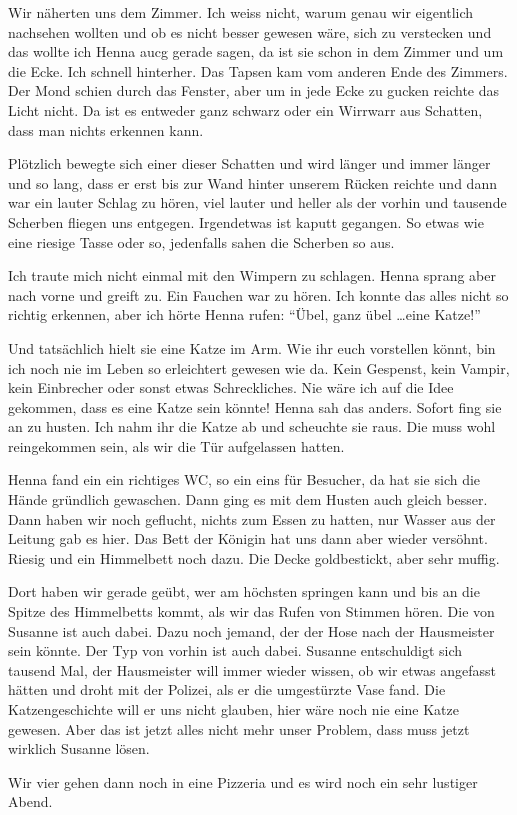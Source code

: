 Wir näherten uns dem Zimmer. Ich weiss nicht, warum genau wir eigentlich nachsehen wollten und ob es nicht besser gewesen wäre, sich zu verstecken und das wollte ich Henna aucg gerade sagen, da ist sie schon in dem Zimmer und um die Ecke. Ich schnell hinterher. Das Tapsen kam vom anderen Ende des Zimmers. Der Mond schien durch das Fenster, aber um in jede Ecke zu gucken reichte das Licht nicht. Da ist es entweder ganz schwarz oder ein Wirrwarr aus Schatten, dass man nichts erkennen kann.

Plötzlich bewegte sich einer dieser Schatten und wird länger und immer länger und so lang, dass er erst bis zur Wand hinter unserem Rücken reichte und dann war ein lauter Schlag zu hören, viel lauter und heller als der vorhin und tausende Scherben fliegen uns entgegen. Irgendetwas ist kaputt gegangen. So etwas wie eine riesige Tasse oder so, jedenfalls sahen die Scherben so aus.

Ich traute mich nicht einmal mit den Wimpern zu schlagen. Henna sprang aber nach vorne und greift zu. Ein Fauchen war zu hören. Ich konnte das alles nicht so richtig erkennen, aber ich hörte Henna rufen: \enquote{Übel, ganz übel \dots eine Katze!}

Und tatsächlich hielt sie eine Katze im Arm. Wie ihr euch vorstellen könnt, bin ich noch nie im Leben so erleichtert gewesen wie da. Kein Gespenst, kein Vampir, kein Einbrecher oder sonst etwas Schreckliches. Nie wäre ich auf die Idee gekommen, dass es eine Katze sein könnte! Henna sah das anders. Sofort fing sie an zu husten. Ich nahm ihr die Katze ab und scheuchte sie raus. Die muss wohl reingekommen sein, als wir die Tür aufgelassen hatten.

Henna fand ein ein richtiges WC, so ein eins für Besucher, da hat sie sich die Hände gründlich gewaschen. Dann ging es mit dem Husten auch gleich besser. Dann haben wir noch geflucht, nichts zum Essen zu hatten, nur Wasser aus der Leitung gab es hier. Das Bett der Königin hat uns dann aber wieder versöhnt. Riesig und ein Himmelbett noch dazu. Die Decke goldbestickt, aber sehr muffig. 

Dort haben wir gerade geübt, wer am höchsten springen kann und bis an die Spitze des Himmelbetts kommt, als wir das Rufen von Stimmen hören. Die von Susanne ist auch dabei. Dazu noch jemand, der der Hose nach der Hausmeister sein könnte. Der Typ von vorhin ist auch dabei. Susanne entschuldigt sich tausend Mal, der Hausmeister will immer wieder wissen, ob wir etwas angefasst hätten und droht mit der Polizei, als er die umgestürzte Vase fand. Die Katzengeschichte will er uns nicht glauben, hier wäre noch nie eine Katze gewesen. Aber das ist jetzt alles nicht mehr unser Problem, dass muss jetzt wirklich Susanne lösen.

Wir vier gehen dann noch in eine Pizzeria und es wird noch ein sehr lustiger Abend. \hfill {\color{red}\decofourleft}




